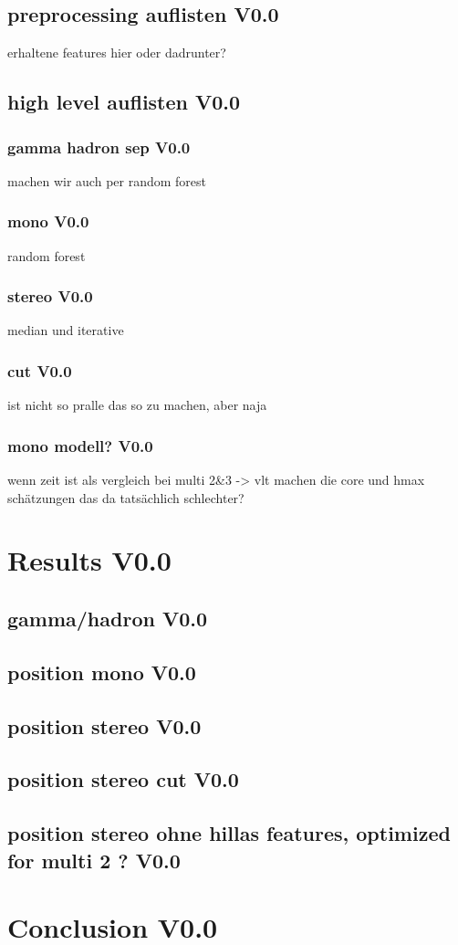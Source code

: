 \section{preprocessing auflisten V0.0}
erhaltene features hier oder dadrunter?
\section{high level auflisten V0.0}
\subsection{gamma hadron sep V0.0}
machen wir auch per random forest 
\subsection{mono V0.0}
random forest
\subsection{stereo V0.0}
median und iterative
\subsection{cut V0.0}
ist nicht so pralle das so zu machen, aber naja
\subsection{mono modell? V0.0}
wenn zeit ist als vergleich bei multi 2&3
-> vlt machen die core und hmax schätzungen das da tatsächlich schlechter?

\chapter{Results V0.0}
\section{gamma/hadron V0.0}
\section{position mono V0.0}
\section{position stereo V0.0}
\section{position stereo cut V0.0}
\section{position stereo ohne hillas features, optimized for multi 2 ? V0.0}

\chapter{Conclusion V0.0}